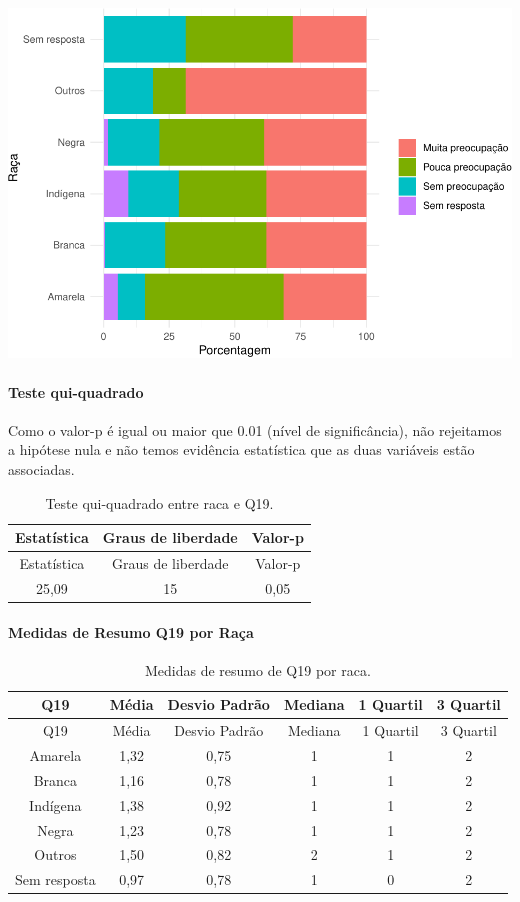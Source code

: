 \documentclass[]{article}
\let\oldparagraph\paragraph
\renewcommand{\paragraph}[1]{\oldparagraph{#1}\mbox{}}
\begin{document}
\begin{center}\includegraphics[width=0.75\linewidth]{relatorio_covid19_files/figure-latex/unnamed-chunk-339-1} \end{center}

\hypertarget{teste-qui-quadrado-30}{%
\paragraph{Teste qui-quadrado}\label{teste-qui-quadrado-30}}

Como o valor-p é igual ou maior que 0.01 (nível de significância), não rejeitamos a hipótese nula e não temos evidência estatística que as duas variáveis estão associadas.

\begin{longtable}[]{@{}ccc@{}}
\caption{\label{tab:unnamed-chunk-341}Teste qui-quadrado entre raca e Q19.}\tabularnewline
\toprule
Estatística & Graus de liberdade & Valor-p\tabularnewline
\midrule
\endfirsthead
\toprule
Estatística & Graus de liberdade & Valor-p\tabularnewline
\midrule
\endhead
25,09 & 15 & 0,05\tabularnewline
\bottomrule
\end{longtable}

\cleardoublepage

\hypertarget{medidas-de-resumo-q19-por-rauxe7a}{%
\paragraph{Medidas de Resumo Q19 por Raça}\label{medidas-de-resumo-q19-por-rauxe7a}}

\begin{longtable}[]{@{}cccccc@{}}
\caption{\label{tab:unnamed-chunk-342}Medidas de resumo de Q19 por raca.}\tabularnewline
\toprule
Q19 & Média & Desvio Padrão & Mediana & 1 Quartil & 3 Quartil\tabularnewline
\midrule
\endfirsthead
\toprule
Q19 & Média & Desvio Padrão & Mediana & 1 Quartil & 3 Quartil\tabularnewline
\midrule
\endhead
Amarela & 1,32 & 0,75 & 1 & 1 & 2\tabularnewline
Branca & 1,16 & 0,78 & 1 & 1 & 2\tabularnewline
Indígena & 1,38 & 0,92 & 1 & 1 & 2\tabularnewline
Negra & 1,23 & 0,78 & 1 & 1 & 2\tabularnewline
Outros & 1,50 & 0,82 & 2 & 1 & 2\tabularnewline
Sem resposta & 0,97 & 0,78 & 1 & 0 & 2\tabularnewline
\bottomrule
\end{longtable}
\end{document}
